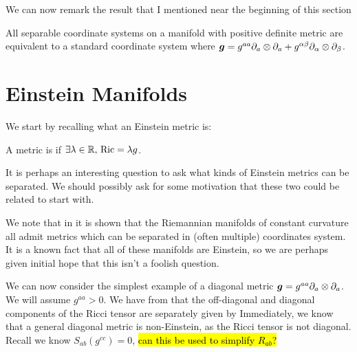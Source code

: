 \documentclass{article}
\begin{document}
We can now remark the result that I mentioned near the beginning of this section 

\begin{theorem}
All separable coordinate systems on a manifold with positive definite metric are equivalent to a standard coordinate system where $\bm{g} = g^{aa} \partial_a \otimes \partial_a + g^{\alpha\beta} \partial_\alpha \otimes \partial_\beta$. 
\end{theorem}

\section{Einstein Manifolds}

We start by recalling what an Einstein metric is:

\begin{definition}
A metric is  if $\exists \lambda \in \mathbb{R}, \, \operatorname{Ric} = \lambda g$. 
\end{definition}

It is perhaps an interesting question to ask what kinds of Einstein metrics can be separated. We should possibly ask for some motivation that these two could be related to start with. 

\begin{example}
We note that in \cite{Kalnins1986} it is shown that the Riemannian manifolds of constant curvature all admit metrics which can be separated in (often multiple) coordinates system. It is a known fact that all of these manifolds are Einstein, so we are perhaps given initial hope that this isn't a foolish question. 
\end{example}

We can now consider the simplest example of a diagonal metric $\bm{g} = g^{aa} \partial_a \otimes \partial_a$. We will assume $g^{aa} > 0$. We have from \cite{Win1996} that the off-diagonal and diagonal components of the Ricci tensor are separately given by 
Immediately, we know that a general diagonal metric is non-Einstein, as the Ricci tensor is not diagonal. \\
Recall we know $S_{ab}(g^{cc}) = 0$, \hl{can this be used to simplify $R_{ab}$?}
\end{document}
